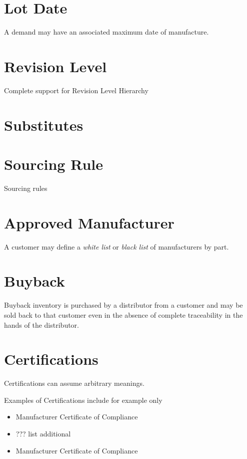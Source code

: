 \documentclass[letterpaper,10pt,english]{sphinxmanual}
\begin{document}
\section{Lot Date}
\label{APS/ApsFeatures:lot-date}
A demand may have an associated maximum date of manufacture.


\section{Revision Level}
\label{APS/ApsFeatures:revision-level}
Complete support for Revision Level Hierarchy


\section{Substitutes}
\label{APS/ApsFeatures:substitutes}

\section{Sourcing Rule}
\label{APS/ApsFeatures:sourcing-rule}
Sourcing rules


\section{Approved Manufacturer}
\label{APS/ApsFeatures:id16}
A customer may define a \emph{white list} or \emph{black list} of manufacturers by
part.


\section{Buyback}
\label{APS/ApsFeatures:id17}
Buyback inventory is purchased by a distributor from a customer and may
be sold back to that customer even in the absence of complete
traceability in the hands of the distributor.


\section{Certifications}
\label{APS/ApsFeatures:id18}
Certifications can assume arbitrary meanings.

Examples of Certifications include for example only
\begin{itemize}
\item {} 
Manufacturer Certificate of Compliance

\item {} 
??? list additional

\item {} 
Manufacturer Certificate of Compliance

\end{itemize}
\end{document}
